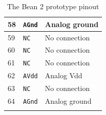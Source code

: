 \documentclass[11pt,letterpaper,spanish]{article}
\begin{document}
\begin{center}
\begin{longtable}{|l|l|l|}
58 & \verb=AGnd= & Analog ground \\\hline
59 & \verb=NC= & No connection \\\hline
60 & \verb=NC= & No connection \\\hline
61 & \verb=NC= & No connection \\\hline
62 & \verb=AVdd= & Analog Vdd \\\hline
63 & \verb=NC= & No connection \\\hline
64 & \verb=AGnd= & Analog ground \\\hline
\caption{\label{pinout}The Bean 2 prototype pinout}
\end{longtable}
\end{center}
\end{document}
